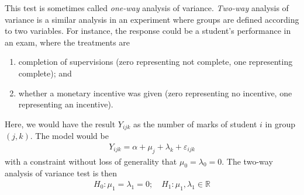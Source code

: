 \begin{remark}
	This test is sometimes called \textit{one-way} analysis of variance.
	\textit{Two-way} analysis of variance is a similar analysis in an experiment where groups are defined according to two variables.
	For instance, the response could be a student's performance in an exam, where the treatments are
	\begin{enumerate}
		\item completion of supervisions (zero representing not complete, one representing complete); and
		\item whether a monetary incentive was given (zero representing no incentive, one representing an incentive).
	\end{enumerate}
	Here, we would have the result $Y_{ijk}$ as the number of marks of student $i$ in group $(j,k)$.
	The model would be
	\begin{align*}
		Y_{ijk} = \alpha + \mu_j + \lambda_k + \varepsilon_{ijk}
	\end{align*}
	with a constraint without loss of generality that $\mu_0 = \lambda_0 = 0$.
	The two-way analysis of variance test is then
	\begin{align*}
		H_0 \colon \mu_1 = \lambda_1 = 0;\quad H_1 \colon \mu_1, \lambda_1 \in \mathbb R
	\end{align*}
\end{remark}

